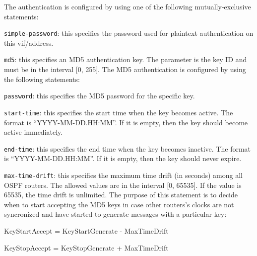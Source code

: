 \begin{description}
\begin{description}
\begin{description}
The authentication is configured by using one of the following
mutually-exclusive statements:

\begin{description}
\item{\tt simple-password}: this specifies the password used for
  plaintext authentication on this vif/address.
\item{\tt md5}: this specifies an MD5 authentication key. The parameter
  is the key ID and must be in the interval [0, 255].
  The MD5 authentication is configured by using the following
  statements:
\begin{description}
  \item{\tt password}: this specifies the MD5 password for the specific
  key.
  \item{\tt start-time}: this specifies the start time when the key
  becomes active. The format is ``YYYY-MM-DD.HH:MM''. If it is empty,
  then the key should become active immediately.
  \item{\tt end-time}: this specifies the end time when the key becomes
  inactive. The format is ``YYYY-MM-DD.HH:MM''. If it is empty,
  then the key should never expire.
  \item{\tt max-time-drift}: this specifies the maximum time drift
  (in seconds) among all OSPF routers.  The allowed values are in the
  interval [0, 65535]. If the value is 65535, the time drift is
  unlimited. The purpose of this statement is to decide when to start
  accepting the MD5 keys in case other routers's clocks are not
  syncronized and  have started to generate messages with a particular
  key:

\begin{description}
  \item KeyStartAccept = KeyStartGenerate - MaxTimeDrift
  \item KeyStopAccept  = KeyStopGenerate  + MaxTimeDrift
\end{description}

\end{description}
\end{description}
\end{description}


\end{description}
\end{description}
